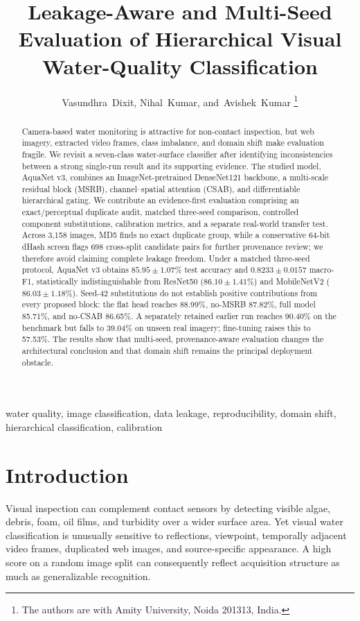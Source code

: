 \documentclass[journal]{IEEEtran}
\begin{document}
\title{Leakage-Aware and Multi-Seed Evaluation of Hierarchical Visual Water-Quality Classification}
\author{Vasundhra~Dixit, Nihal~Kumar, and~Avishek~Kumar%
\thanks{The authors are with Amity University, Noida 201313, India.}}
\maketitle
\begin{abstract}
Camera-based water monitoring is attractive for non-contact inspection, but web imagery, extracted video frames, class imbalance, and domain shift make evaluation fragile. We revisit a seven-class water-surface classifier after identifying inconsistencies between a strong single-run result and its supporting evidence. The studied model, AquaNet v3, combines an ImageNet-pretrained DenseNet121 backbone, a multi-scale residual block (MSRB), channel--spatial attention (CSAB), and differentiable hierarchical gating. We contribute an evidence-first evaluation comprising an exact/perceptual duplicate audit, matched three-seed comparison, controlled component substitutions, calibration metrics, and a separate real-world transfer test. Across 3,158 images, MD5 finds no exact duplicate group, while a conservative 64-bit dHash screen flags 698 cross-split candidate pairs for further provenance review; we therefore avoid claiming complete leakage freedom. Under a matched three-seed protocol, AquaNet v3 obtains $85.95\pm1.07\%$ test accuracy and $0.8233\pm0.0157$ macro-F1, statistically indistinguishable from ResNet50 ($86.10\pm1.41\%$) and MobileNetV2 ($86.03\pm1.18\%$). Seed-42 substitutions do not establish positive contributions from every proposed block: the flat head reaches 88.99\%, no-MSRB 87.82\%, full model 85.71\%, and no-CSAB 86.65\%. A separately retained earlier run reaches 90.40\% on the benchmark but falls to 39.04\% on unseen real imagery; fine-tuning raises this to 57.53\%. The results show that multi-seed, provenance-aware evaluation changes the architectural conclusion and that domain shift remains the principal deployment obstacle.
\end{abstract}
\begin{IEEEkeywords}water quality, image classification, data leakage, reproducibility, domain shift, hierarchical classification, calibration
\end{IEEEkeywords}

\section{Introduction}
Visual inspection can complement contact sensors by detecting visible algae, debris, foam, oil films, and turbidity over a wider surface area. Yet visual water classification is unusually sensitive to reflections, viewpoint, temporally adjacent video frames, duplicated web images, and source-specific appearance. A high score on a random image split can consequently reflect acquisition structure as much as generalizable recognition.
\end{document}
